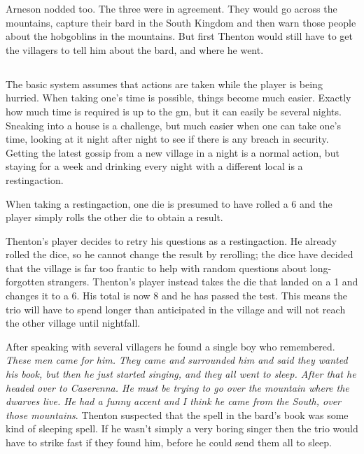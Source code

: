\begin{multicols}{2}
\begin{exampletext}
Arneson nodded too.
The three were in agreement.
They would go across the mountains, capture their bard in the South Kingdom and then warn those people about the hobgoblins in the mountains.
But first Thenton would still have to get the villagers to tell him about the bard, and where he went.\end{exampletext}

\subsection{}\label{restingactions}

The basic system assumes that actions are taken while the player is being hurried.
When taking one's time is possible, things become much easier.
Exactly how much time is required is up to the \gls{gm}, but it can easily be several nights.
Sneaking into a house is a challenge, but much easier when one can take one's time, looking at it night after night to see if there is any breach in security.
Getting the latest gossip from a new village in a night is a normal action, but staying for a week and drinking every night with a different local is a \gls{restingaction}.

When taking a \gls{restingaction}, one die is presumed to have rolled a 6 and the player simply rolls the other die to obtain a result.

\begin{exampletext}

	Thenton's player decides to retry his questions as a \gls{restingaction}.
	He already rolled the dice, so he cannot change the result by rerolling; the dice have decided that the village is far too frantic to help with random questions about long-forgotten strangers.
	Thenton's player instead takes the die that landed on a 1 and changes it to a 6.
	His total is now 8 and he has passed the test.
	This means the trio will have to spend longer than anticipated in the village and will not reach the other village until nightfall.

	After speaking with several villagers he found a single boy who remembered. \emph{These men came for him. They came and surrounded him and said they wanted his book, but then he just started singing, and they all went to sleep. After that he headed over to Caserenna. He must be trying to go over the mountain where the dwarves live. He had a funny accent and I think he came from the South, over those mountains}. Thenton suspected that the spell in the bard's book was some kind of sleeping spell. If he wasn't simply a very boring singer then the trio would have to strike fast if they found him, before he could send them all to sleep.


\end{exampletext}
\end{multicols}
